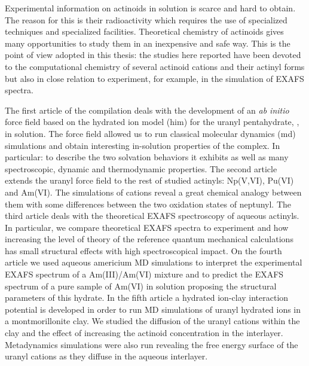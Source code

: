 Experimental information on actinoids in solution is scarce and hard to 
obtain.\cite{Ions_in_sol_and_Marcus_2016,actinides_solution_v2,chemrev_Altmaier_2013} The 
reason for 
this is their radioactivity which requires 
the use of specialized techniques and specialized facilities.\cite{Pichon2017} 
Theoretical chemistry of actinoids gives many opportunities to study them in an 
inexpensive and safe way. This is the point of view adopted in this thesis: the studies here 
reported have been devoted to the 
computational chemistry of several actinoid cations and their actinyl forms but also in close 
relation to experiment, for example, in the simulation of EXAFS spectra. 

The first article of the compilation deals with the development of an \textit{ab initio} force 
field based on the hydrated ion model\cite{JPhysChem_ESM_1993,JChemPhys_ESM_1998} (\gls{him}) for the 
uranyl pentahydrate, , in 
solution. The force field allowed us to run classical molecular dynamics (\gls{md}) simulations 
and 
obtain 
interesting \newline in-solution properties of the complex. In particular: to describe the two 
solvation 
behaviors it 
exhibits as well as many spectroscopic, dynamic and thermodynamic properties. The second article 
extends the uranyl force field to the rest of studied actinyls: Np(V,VI), Pu(VI) and Am(VI). The 
simulations of cations reveal a great chemical analogy between them with some differences 
between the two oxidation states of neptunyl. The third article deals with the theoretical 
EXAFS 
 spectroscopy of aqueous actinyls. In particular, we compare theoretical EXAFS spectra to 
experiment and how increasing the level of theory of the reference quantum mechanical 
calculations has small 
structural effects with high spectroscopical impact. On the fourth article we used aqueous americium
MD simulations to interpret the experimental EXAFS spectrum of a Am(III)/Am(VI) 
mixture\cite{JRadioanNucChem_Riddle_2016} and to predict the EXAFS spectrum of a pure sample 
of Am(VI) in 
solution proposing the structural 
parameters of this hydrate. In the fifth article a hydrated ion-clay interaction potential is 
developed in 
order to run MD simulations of uranyl hydrated ions in a montmorillonite clay. We 
studied the diffusion of the uranyl cations within the clay and the effect of increasing the 
actinoid concentration in the interlayer. Metadynamics simulations were also run revealing the free 
energy surface of the uranyl cations as they diffuse in the aqueous interlayer. 

